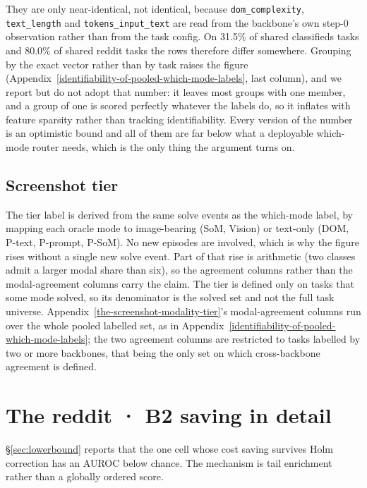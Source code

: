 They are only near-identical, not identical, because \texttt{dom\_\allowbreak{}complexity}, \texttt{text\_\allowbreak{}length} and \texttt{tokens\_\allowbreak{}input\_\allowbreak{}text} are read from the backbone's own step-0 observation rather than from the task config. On 31.5\% of shared classifieds tasks and 80.0\% of shared reddit tasks the rows therefore differ somewhere. Grouping by the exact vector rather than by task raises the figure (Appendix~\ref{identifiability-of-pooled-which-mode-labels}, last column), and we report but do not adopt that number: it leaves most groups with one member, and a group of one is scored perfectly whatever the labels do, so it inflates with feature sparsity rather than tracking identifiability. Every version of the number is an optimistic bound and all of them are far below what a deployable which-mode router needs, which is the only thing the argument turns on.

\subsection{Screenshot tier}\label{screenshot-tier}

The tier label is derived from the same solve events as the which-mode label, by mapping each oracle mode to image-bearing (SoM, Vision) or text-only (DOM, P-text, P-prompt, P-SoM). No new episodes are involved, which is why the figure rises without a single new solve event. Part of that rise is arithmetic (two classes admit a larger modal share than six), so the agreement columns rather than the modal-agreement columns carry the claim. The tier is defined only on tasks that some mode solved, so its denominator is the solved set and not the full task universe. Appendix~\ref{the-screenshot-modality-tier}'s modal-agreement columns run over the whole pooled labelled set, as in Appendix~\ref{identifiability-of-pooled-which-mode-labels}; the two agreement columns are restricted to tasks labelled by two or more backbones, that being the only set on which cross-backbone agreement is defined.

\section{The reddit · B2 saving in detail}\label{the-reddit-b2-saving-in-detail}

\S\ref{sec:lowerbound} reports that the one cell whose cost saving survives Holm correction has an AUROC below chance. The mechanism is tail enrichment rather than a globally ordered score.

